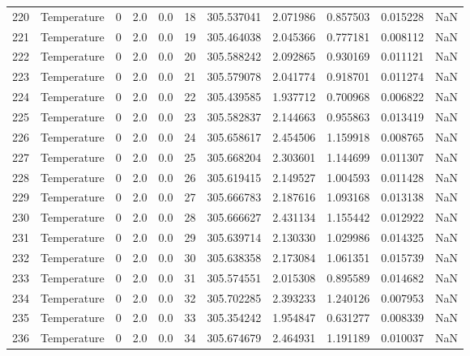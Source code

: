 \begin{tabular}{llrrrrrrrrr}
220 &  Temperature &       0 &  2.0 &  0.0 &   18 &  305.537041 &  2.071986 &  0.857503 &   0.015228 &      NaN \\
221 &  Temperature &       0 &  2.0 &  0.0 &   19 &  305.464038 &  2.045366 &  0.777181 &   0.008112 &      NaN \\
222 &  Temperature &       0 &  2.0 &  0.0 &   20 &  305.588242 &  2.092865 &  0.930169 &   0.011121 &      NaN \\
223 &  Temperature &       0 &  2.0 &  0.0 &   21 &  305.579078 &  2.041774 &  0.918701 &   0.011274 &      NaN \\
224 &  Temperature &       0 &  2.0 &  0.0 &   22 &  305.439585 &  1.937712 &  0.700968 &   0.006822 &      NaN \\
225 &  Temperature &       0 &  2.0 &  0.0 &   23 &  305.582837 &  2.144663 &  0.955863 &   0.013419 &      NaN \\
226 &  Temperature &       0 &  2.0 &  0.0 &   24 &  305.658617 &  2.454506 &  1.159918 &   0.008765 &      NaN \\
227 &  Temperature &       0 &  2.0 &  0.0 &   25 &  305.668204 &  2.303601 &  1.144699 &   0.011307 &      NaN \\
228 &  Temperature &       0 &  2.0 &  0.0 &   26 &  305.619415 &  2.149527 &  1.004593 &   0.011428 &      NaN \\
229 &  Temperature &       0 &  2.0 &  0.0 &   27 &  305.666783 &  2.187616 &  1.093168 &   0.013138 &      NaN \\
230 &  Temperature &       0 &  2.0 &  0.0 &   28 &  305.666627 &  2.431134 &  1.155442 &   0.012922 &      NaN \\
231 &  Temperature &       0 &  2.0 &  0.0 &   29 &  305.639714 &  2.130330 &  1.029986 &   0.014325 &      NaN \\
232 &  Temperature &       0 &  2.0 &  0.0 &   30 &  305.638358 &  2.173084 &  1.061351 &   0.015739 &      NaN \\
233 &  Temperature &       0 &  2.0 &  0.0 &   31 &  305.574551 &  2.015308 &  0.895589 &   0.014682 &      NaN \\
234 &  Temperature &       0 &  2.0 &  0.0 &   32 &  305.702285 &  2.393233 &  1.240126 &   0.007953 &      NaN \\
235 &  Temperature &       0 &  2.0 &  0.0 &   33 &  305.354242 &  1.954847 &  0.631277 &   0.008339 &      NaN \\
236 &  Temperature &       0 &  2.0 &  0.0 &   34 &  305.674679 &  2.464931 &  1.191189 &   0.010037 &      NaN \\

\end{tabular}
